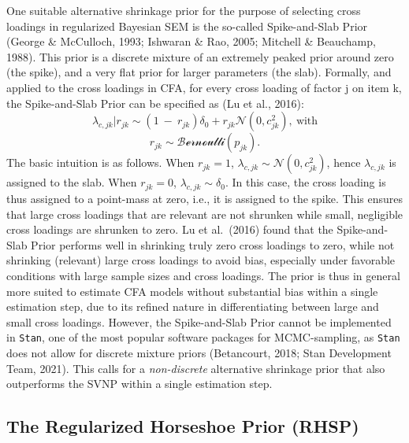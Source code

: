 \documentclass[
  man, donotrepeattitle,floatsintext]{apa6}
\begin{document}
One suitable alternative shrinkage prior for the purpose of selecting
cross loadings in regularized Bayesian SEM is the so-called
Spike-and-Slab Prior (George \& McCulloch, 1993; Ishwaran \& Rao, 2005; Mitchell \& Beauchamp, 1988). This prior is a discrete mixture of an
extremely peaked prior around zero (the spike), and a very flat prior
for larger parameters (the slab). Formally, and applied to the cross
loadings in CFA, for every cross loading of factor j on item k, the
Spike-and-Slab Prior can be specified as (Lu et al., 2016):
\[\lambda_{c,jk} |r_{jk} \sim (1 \ - \ r_{jk})\delta_0 + r_{jk} \mathcal{N}(0, c^2_{jk}) , \ \text{with}\]
\[r_{jk} \sim \mathcal{Bernoulli}(p_{jk}).\] The basic intuition is as
follows. When \(r_{jk} = 1\),
\(\lambda_{c,jk} \sim \mathcal{N}(0, c^2_{jk})\), hence \(\lambda_{c,jk}\)
is assigned to the slab. When \(r_{jk} = 0\),
\(\lambda_{c,jk} \sim \delta_0\). In this case, the cross loading is thus
assigned to a point-mass at zero, i.e., it is assigned to the spike.
This ensures that large cross loadings that are relevant are not
shrunken while small, negligible cross loadings are shrunken to zero. Lu
et al.~(2016) found that the Spike-and-Slab Prior performs well in shrinking
truly zero cross loadings to zero, while not shrinking (relevant) large
cross loadings to avoid bias, especially under favorable conditions with
large sample sizes and cross loadings. The prior is thus in general more
suited to estimate CFA models without substantial bias within a single
estimation step, due to its refined nature in differentiating between
large and small cross loadings. However, the Spike-and-Slab Prior cannot
be implemented in \texttt{Stan}, one of the most popular software packages for
MCMC-sampling, as \texttt{Stan} does not allow for discrete mixture priors
(Betancourt, 2018; Stan Development Team, 2021). This
calls for a \emph{non-discrete} alternative shrinkage prior that also
outperforms the SVNP within a single estimation step.

\subsection{The Regularized Horseshoe Prior (RHSP)}\label{the-regularized-horseshoe-prior-rhsp}
\end{document}
